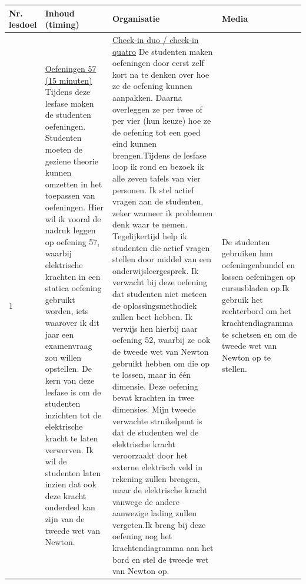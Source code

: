 \begin{landscape}
\begin{tabularx}{1.56\textwidth}{|p{1.5cm}|p{6cm}|X|p{4cm}|}
	\hline
	\textbf{Nr. lesdoel } & \textbf{Inhoud (timing)}  & \textbf{Organisatie } & \textbf{Media } \\ \hline
	1\newline 2\newline 3\newline 9	&\underline{Oefeningen 57 (15 minuten)}\newline
	Tijdens deze lesfase maken de studenten oefeningen. Studenten moeten de geziene theorie kunnen omzetten in het toepassen van oefeningen.  Hier wil ik vooral de nadruk leggen op oefening 57, waarbij elektrische krachten in een statica oefening gebruikt worden, iets waarover ik dit jaar een examenvraag zou willen opstellen.   \newline De kern van deze lesfase is om de studenten inzichten tot de elektrische kracht te laten verwerven. Ik wil de studenten laten inzien dat ook deze kracht onderdeel kan zijn van de tweede wet van Newton.
	
	&  \underline{Check-in duo / check-in quatro}\newline 
	De studenten maken oefeningen door eerst zelf kort na te denken over hoe ze de oefening kunnen aanpakken. Daarna overleggen ze per twee of per vier (hun keuze) hoe ze de oefening tot een goed eind kunnen brengen.\newline	Tijdens de lesfase loop ik rond en bezoek ik alle zeven tafels van vier personen. Ik stel actief vragen aan de studenten, zeker wanneer ik problemen denk waar te nemen. Tegelijkertijd help ik studenten die actief vragen stellen door middel van een onderwijsleergesprek. \newline
	Ik verwacht bij deze oefening dat studenten niet meteen de oplossingsmethodiek zullen beet hebben. Ik verwijs hen hierbij naar oefening 52, waarbij ze ook de tweede wet van Newton gebruikt hebben om die op te lossen, maar in één dimensie. Deze oefening  bevat krachten in twee dimensies. Mijn tweede verwachte struikelpunt is dat de studenten  wel de elektrische kracht veroorzaakt door het externe elektrisch veld in rekening zullen brengen, maar de elektrische kracht vanwege de andere aanwezige lading zullen vergeten.\newline Ik breng bij deze oefening nog het krachtendiagramma aan het bord en stel de tweede wet van Newton op.
	& De studenten gebruiken hun oefeningenbundel en lossen oefeningen op cursusbladen op.\newline Ik gebruik het rechterbord om het krachtendiagramma te schetsen en om de tweede wet van Newton op te stellen. 
	\\ \hline
\end{tabularx}



\end{landscape}
